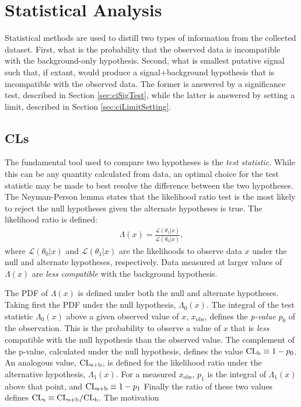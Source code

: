 \section{Statistical Analysis}\label{sec:ciStat}

Statistical methods are used to distill two types of information from the collected dataset.
First, what is the probability that the observed data is incompatible with the background-only hypothesis.
Second, what is smallest putative signal such that, if extant, would produce a signal+background hypothesis that is incompatible with the observed data.
The former is answered by a significance test, described in Section \ref{sec:ciSigTest}, while the latter is answered by setting a limit, described in Section \ref{sec:ciLimitSetting}.

\subsection{CLs}

The fundamental tool used to compare two hypotheses is the \emph{test statistic}.
While this can be any quantity calculated from data, an optimal choice for the test statistic may be made to best resolve the difference between the two hypotheses.
The Neyman-Person lemma states that the likelihood ratio test is the most likely to reject the null hypotheses given the alternate hypotheses is true.
The likelihood ratio is defined:
\begin{equation}\begin{split}
\Lambda(x)=\frac{\mathcal{L}(\theta_1|x)}{\mathcal{L}(\theta_0|x)},
\end{split}\end{equation} 
where $\mathcal{L}(\theta_0|x)$ and $\mathcal{L}(\theta_1|x)$ are the likelihoods to observe data $x$ under the null and alternate hypotheses, respectively.
Data measured at larger values of $\Lambda(x)$ are \emph{less compatible} with the background hypothesis.

The PDF of $\Lambda(x)$ is defined under both the null and alternate hypotheses.
Taking first the PDF under the null hypothesis, $\Lambda_0(x)$.
The integral of the test statistic $\Lambda_0(x)$ above a given observed value of $x$, $x_\text{obs}$, defines the \emph{p-value} $p_0$ of the observation.
This is the probability to observe a value of $x$ that is \emph{less} compatible with the null hypothesis than the observed value.
The complement of the p-value, calculated under the null hypothesis, defines the value $\text{CL}_\text{b}\equiv1-p_0$.
An analogous value, $\text{CL}_\text{s+b}$, is defined for the likelihood ratio under the alternative hypothesis, $\Lambda_1(x)$.
For a measured $x_\text{obs}$, $p_1$ is the integral of $\Lambda_1(x)$ above that point, and $\text{CL}_\text{s+b}\equiv1-p_1$
Finally the ratio of these two values defines $\text{CL}_\text{s}\equiv \text{CL}_\text{s+b}/\text{CL}_\text{b}$.
The motivation 

